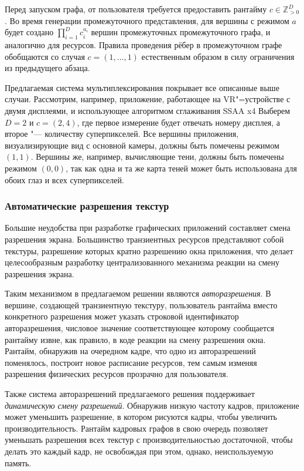 Перед запуском графа, от пользователя требуется предоставить рантайму $c \in \mathbb{Z}_{>0}^D$.
Во время генерации промежуточного представления, для вершины с режимом $a$ будет создано $\prod_{i=1}^{D} c_i^{a_i}$ вершин  промежуточных промежуточного графа, и аналогично для ресурсов.
Правила проведения рёбер в промежуточном графе обобщаются со случая $c = \left(1, \dots, 1\right)$ естественным образом в силу ограничения из предыдущего абзаца.

Предлагаемая система мультиплексирования покрывает все описанные выше случаи.
Рассмотрим, например, приложение, работающее на VR"=устройстве с двумя дисплеями, и использующее алгоритмом сглаживания SSAA x4
Выберем $D = 2$ и $c = (2, 4)$, где первое измерение будет отвечать номеру дисплея, а второе "--- количеству суперпикселей.
Все вершины приложения, визуализирующие вид с основной камеры, должны быть помечены режимом $(1, 1)$.
Вершины же, например, вычисляющие тени, должны быть помечены режимом $(0, 0)$, так как одна и та же карта теней может быть использована для обоих глаз и всех суперпикселей.

\subsubsection{Автоматические разрешения текстур}
Большие неудобства при разработке графических приложений составляет смена разрешения экрана.
Большинство транзиентных ресурсов представляют собой текстуры, разрешение которых кратно разрешению окна приложения, что делает целесообразным разработку централизованного механизма реакции на смену разрешения экрана.

Таким механизмом в предлагаемом решении являются \textit{авторазрешения}.
В вершине, создающей транзиентную текстуру, пользователь рантайма вместо конкретного разрешения может указать строковой идентификатор авторазрешения, числовое значение соответствующее которому сообщается рантайму извне, как правило, в коде реакции на смену разрешения окна.
Рантайм, обнаружив на очередном кадре, что одно из авторазрешений поменялось, построит новое расписание ресурсов, тем самым изменяя разрешения физических ресурсов прозрачно для пользователя.

Также система авторазрешений предлагаемого решения поддерживает \textit{динамическую смену разрешений}.
Обнаружив низкую частоту кадров, приложение может уменьшить разрешение, в котором рисуются кадры, чтобы увеличить производительность.
Рантайм кадровых графов в свою очередь позволяет уменьшать разрешения всех текстур с производительностью достаточной, чтобы делать это каждый кадр, не освобождая при этом, однако, неиспользуемую память.

